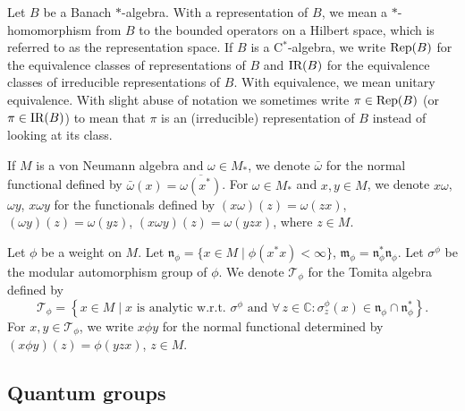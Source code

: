 \documentclass[11pt]{article}
\numberwithin{equation}{section}
\theoremstyle{definition}
\newcommand{\Rep}{\text{\rm Rep}}
\newcommand{\IR}{\text{\rm IR}}
\begin{document}
Let $B$ be a Banach $\ast$-algebra. With a representation of $B$, we mean a $\ast$-homomorphism from $B$ to the bounded operators on a Hilbert space, which is referred to as the representation space. If $B$ is a C$^\ast$-algebra, we write $\Rep(B)$ for the equivalence classes of representations of $B$ and $\IR(B)$ for the equivalence classes of irreducible representations of $B$. With equivalence, we mean unitary equivalence. With slight abuse of notation we sometimes write $\pi \in \Rep(B)$ (or $\pi \in \IR(B)$) to mean that $\pi$ is an (irreducible) representation of $B$ instead of looking at its class.

 If $M$ is a von Neumann algebra and $\omega \in M_\ast$, we denote $\bar{\omega}$ for the normal functional def\/ined by $\bar{\omega}(x) = \overline{\omega(x^\ast)}$. For $\omega \in M_\ast$ and $x,y \in M$, we denote $x\omega$, $\omega y$, $x \omega y$ for the functionals def\/ined by $(x\omega)(z) = \omega(zx)$, $(\omega y)(z) = \omega(yz)$, $(x\omega y)(z) = \omega(yzx)$, where $z \in M$.

 Let $\phi$ be a weight on  $M$. Let $\mathfrak{n}_\phi = \{ x
\in M \mid \phi(x^\ast x) < \infty \}$, $\mathfrak{m}_\phi =
\mathfrak{n}_\phi^\ast \mathfrak{n}_\phi$. Let $\sigma^\phi$ be the modular automorphism group of $\phi$. We denote $\mathcal{T}_\phi$ for the Tomita
algebra def\/ined by
\[
 \mathcal{T}_\phi = \left\{ x \in M \mid x \textrm{ is analytic w.r.t. } \sigma^\phi \textrm{ and } \forall \,z \in \mathbb{C}: \sigma_z^\phi(x) \in \mathfrak{n}_\phi \cap \mathfrak{n}_\phi^\ast \right\}.
\]
For $x,y \in \mathcal{T}_\phi$, we write $x \phi y$ for the normal functional determined by $(x \phi y)(z) = \phi(yzx)$, $z \in M$.

\subsection*{Quantum groups}
\end{document}
